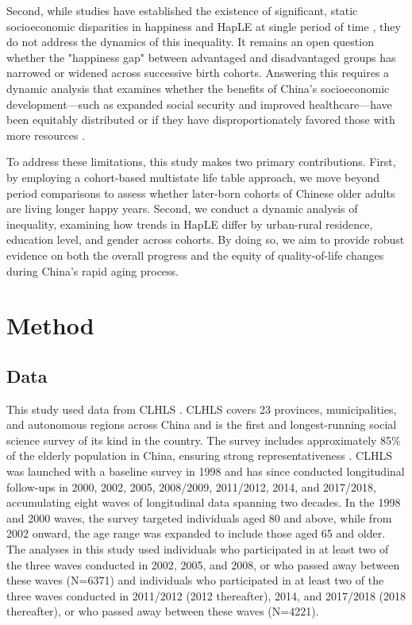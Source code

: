 \documentclass[12pt, a4paper]{article}
\begin{document}
Second, while studies have established the existence of significant, static socioeconomic disparities in happiness and HapLE at single period of time \autocite{wan.2024.socioeconomic}, they do not address the dynamics of this inequality. It remains an open question whether the "happiness gap" between advantaged and disadvantaged groups has narrowed or widened across successive birth cohorts. Answering this requires a dynamic analysis that examines whether the benefits of China’s socioeconomic development—such as expanded social security and improved healthcare—have been equitably distributed or if they have disproportionately favored those with more resources \autocite{liu.2019.are}.

To address these limitations, this study makes two primary contributions. First, by employing a cohort-based multistate life table approach, we move beyond period comparisons to assess whether later-born cohorts of Chinese older adults are living longer happy years. Second, we conduct a dynamic analysis of inequality, examining how trends in HapLE differ by urban-rural residence, education level, and gender across cohorts. By doing so, we aim to provide robust evidence on both the overall progress and the equity of quality-of-life changes during China’s rapid aging process.


\section{Method}
\subsection{Data}
This study used data from CLHLS \autocite{centerforhealthyaginganddevelopmentstudies.2020.chinese}. CLHLS covers 23 provinces, municipalities, and autonomous regions across China and is the first and longest-running social science survey of its kind in the country. The survey includes approximately 85\% of the elderly population in China, ensuring strong representativeness \autocite{gu.2008.general,zeng.2008.introduction}. CLHLS was launched with a baseline survey in 1998 and has since conducted longitudinal follow-ups in 2000, 2002, 2005, 2008/2009, 2011/2012, 2014, and 2017/2018, accumulating eight waves of longitudinal data spanning two decades. In the 1998 and 2000 waves, the survey targeted individuals aged 80 and above, while from 2002 onward, the age range was expanded to include those aged 65 and older. The analyses in this study used individuals who participated in at least two of the three waves conducted in 2002, 2005, and 2008, or who passed away between these waves (N=6371) and individuals who participated in at least two of the three waves conducted in 2011/2012 (2012 thereafter), 2014, and 2017/2018 (2018 thereafter), or who passed away between these waves (N=4221).
\end{document}
